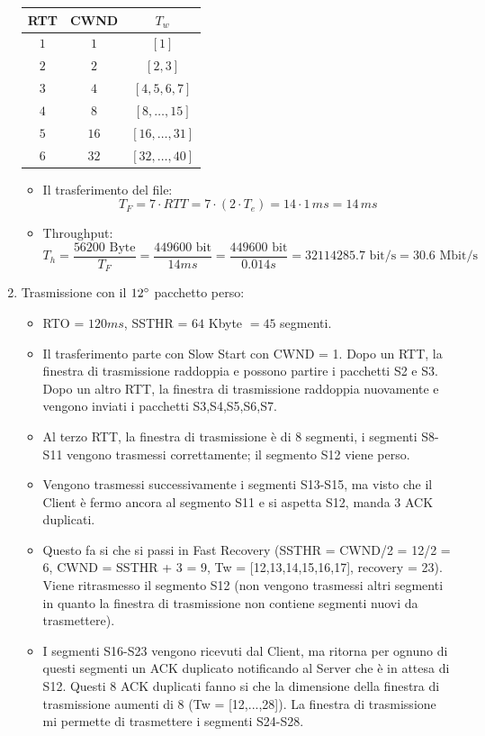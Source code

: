 \documentclass[10pt,a4paper]{article}
\newcommand{\lightrule}{%
	\arrayrulecolor{black!30}%
	\midrule[\lightrulewidth]%
	\arrayrulecolor{black}}
\begin{document}
\begin{enumerate}
\begin{center}
\begin{tabular}{@{} *{3}{c} @{}}
				\toprule
					\textbf{RTT} & \textbf{CWND} & \textbf{$T_w$} \\
				\midrule
					$1$ & $1$ & $[1]$ \\ 
				\lightrule
					$2$ & $2$ & $[2,3]$ \\
				\lightrule
					$3$ & $4$ & $[4,5,6,7]$ \\ 				
				\lightrule
					$4$ & $8$ & $[8,\dots,15]$ \\
				\lightrule
					$5$ & $16$ & $[16,\dots,31]$ \\
				\lightrule
					$6$ & $32$ & $[32,\dots,40]$ \\
				\bottomrule
			\end{tabular}
		\end{center}
		\begin{itemize}
			\item Il trasferimento del file: $$T_{F} = 7 \cdot RTT = 7 \cdot (2 \cdot T_e) = 14 \cdot 1 \,ms = 14 \,ms$$
			\item Throughput: $$T_h = \displaystyle{\frac{56200 \textrm{ Byte}}{T_F} = \frac{449600 \textrm{ bit}}{14 ms} = \frac{449600 \textrm{ bit}}{0.014 s} = 32114285.7 \textrm{ bit/s} = 30.6 \textrm{ Mbit/s}}$$
		\end{itemize}
	\newpage
	\item Trasmissione con il $12 \degree$ pacchetto perso:
	\begin{itemize}
		\item RTO = $120 ms$, SSTHR = $64$ Kbyte $= 45$ segmenti.
		\item Il trasferimento parte con Slow Start con CWND = 1. Dopo un RTT, la finestra di trasmissione raddoppia e possono partire i pacchetti S2 e S3. Dopo un altro RTT, la finestra di trasmissione raddoppia nuovamente e vengono inviati i pacchetti S3,S4,S5,S6,S7.
		\item Al terzo RTT, la finestra di trasmissione è di 8 segmenti, i segmenti S8-S11 vengono trasmessi correttamente; il segmento S12 viene perso.
		\item Vengono trasmessi successivamente i segmenti S13-S15, ma visto che il Client è fermo ancora al segmento S11 e si aspetta S12, manda 3 ACK duplicati.
		\item Questo fa si che si passi in Fast Recovery (SSTHR = CWND/2 = 12/2 = 6, CWND = SSTHR + 3 = 9, Tw = [12,13,14,15,16,17], recovery = 23). Viene ritrasmesso il segmento S12 (non vengono trasmessi altri segmenti in quanto la finestra di trasmissione non contiene segmenti nuovi da trasmettere).
		\item I segmenti S16-S23 vengono ricevuti dal Client, ma ritorna per ognuno di questi segmenti un ACK duplicato notificando al Server che è in attesa di S12. Questi 8 ACK duplicati fanno si che la dimensione della finestra di trasmissione aumenti di 8 (Tw = [12,...,28]). La finestra di trasmissione mi permette di trasmettere i segmenti S24-S28.

\end{itemize}
\end{enumerate}
\end{document}
